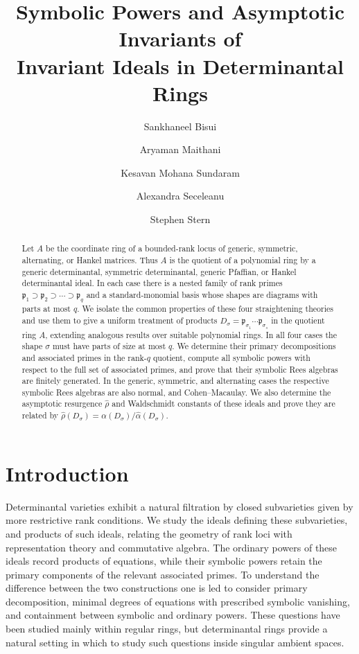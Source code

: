 \documentclass[11pt,reqno]{amsart}
\title[Invariant ideals on determinantal rings]{Symbolic Powers and Asymptotic Invariants of \\ Invariant Ideals in Determinantal Rings}
\author{Sankhaneel Bisui}
\author{Aryaman Maithani}
\author{Kesavan Mohana Sundaram}
\author{Alexandra Seceleanu}
\author{Stephen Stern}
\numberwithin{equation}{subsection}
\theoremstyle{definition}
\theoremstyle{remark}
\newcommand{\fp}{\mathfrak p}
\begin{document}
\begin{abstract}
    Let $A$ be the coordinate ring of a bounded-rank locus of generic,
symmetric, alternating, or Hankel matrices. Thus $A$ is the quotient of a polynomial ring by a generic determinantal, symmetric determinantal, generic Pfaffian, or Hankel determinantal ideal.  In each case there is a
nested family of rank primes
$\fp_1\supset \fp_2\supset\cdots\supset\fp_q$ and a standard-monomial
basis whose shapes are diagrams with parts at most $q$.  We isolate the
common properties of these four straightening theories and use them to
give a uniform treatment of products
$D_\sigma=\fp_{\sigma_1}\cdots\fp_{\sigma_s}$ in the quotient ring $A$, extending analogous results over suitable polynomial rings.  In all four cases the shape $\sigma$ must have parts of size at most $q$.
We determine their primary decompositions and associated primes in the
rank-$q$ quotient, compute all symbolic powers with respect to the full
set of associated primes, and prove that their symbolic Rees algebras
are finitely generated. In the generic, symmetric, and alternating cases the respective symbolic Rees algebras are also normal, and Cohen--Macaulay.  We also determine  the asymptotic resurgence
$\widehat\rho$ and Waldschmidt constants of these ideals and prove they are related by $\widehat\rho(D_\sigma)=\alpha(D_\sigma)/\widehat\alpha(D_\sigma)$. 
\end{abstract}



\maketitle
\setcounter{tocdepth}{1}
\tableofcontents

\section{Introduction}\label{sec:introduction}

Determinantal varieties exhibit a natural filtration by closed subvarieties given by more restrictive rank conditions. We study the ideals defining these subvarieties, and products of such ideals, relating the geometry of rank loci with representation theory and commutative algebra. The ordinary powers of these ideals record products of equations, while their symbolic powers retain the primary components of the relevant associated primes. To understand the difference between the two constructions one is led to consider primary decomposition, minimal degrees of equations with prescribed symbolic vanishing, and containment between symbolic and ordinary powers. These questions have been studied mainly within regular rings, but determinantal rings provide a natural setting in which to study such questions inside singular ambient spaces.
\end{document}
